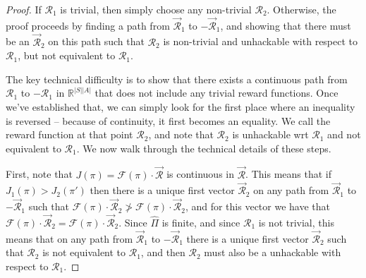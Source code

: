 \begin{proof}
If $\mathcal{R}_1$ is trivial, then simply choose any non-trivial $\mathcal{R}_2$.
Otherwise, the proof proceeds by finding a path from $\vec{\mathcal{R}}_1$ to $-\vec{\mathcal{R}}_1$, and showing that there must be an $\vec{\mathcal{R}}_2$ on this path such that $\mathcal{R}_2$ is non-trivial and unhackable with respect to $\mathcal{R}_1$, but not equivalent to $\mathcal{R}_1$.



The key technical difficulty is to show that there exists a continuous path from $\mathcal{R}_1$ to $-\mathcal{R}_1$ in $\mathbb{R}^{|S||A|}$ that does not include any trivial reward functions. 
Once we've established that, we can simply look for the first place where an inequality is reversed -- because of continuity, it first becomes an equality. 
We call the reward function at that point $\mathcal{R}_2$, and note that $\mathcal{R}_2$ is unhackable wrt $\mathcal{R}_1$ and not equivalent to $\mathcal{R}_1$. 
We now walk through the technical details of these steps.


First, note that $J(\pi) = \mathcal{F}(\pi)\cdot\vec{\mathcal{R}}$ is continuous in $\vec{\mathcal{R}}$. This means that if $J_1(\pi) > J_2(\pi')$ then there is a unique first vector $\vec{\mathcal{R}}_2$ on any path from $\vec{\mathcal{R}}_1$ to $-\vec{\mathcal{R}}_1$ such that $\mathcal{F}(\pi)\cdot\vec{\mathcal{R}}_2 \not> \mathcal{F}(\pi)\cdot\vec{\mathcal{R}}_2$, and for this vector we have that $\mathcal{F}(\pi)\cdot\vec{\mathcal{R}}_2 = \mathcal{F}(\pi)\cdot\vec{\mathcal{R}}_2$. Since $\hat{\Pi}$ is finite, and since $\mathcal{R}_1$ is not trivial, this means that on any path from $\vec{\mathcal{R}}_1$ to $-\vec{\mathcal{R}}_1$ there is a unique first vector $\vec{\mathcal{R}}_2$ such that $\mathcal{R}_2$ is not equivalent to $\mathcal{R}_1$, and then $\mathcal{R}_2$ must also be a unhackable with respect to $\mathcal{R}_1$.



\end{proof}
